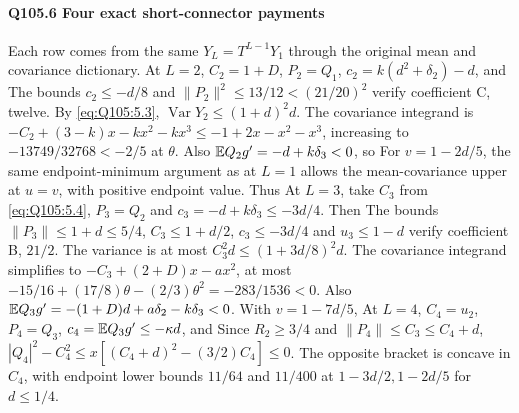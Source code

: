\paragraph{Q105.6 Four exact short-connector payments}\label{part:Q105.6}
Each row comes from the same $Y_L=\allowbreak T^{L-1}Y_1$ through the original
mean and covariance dictionary.
At $L=\allowbreak 2$, $C_2=\allowbreak 1+D$, $P_2=\allowbreak Q_1$, $c_2=\allowbreak k(d^2+\delta_2)-d$, and
The bounds $c_2\le\allowbreak -d/8$ and
$\|P_2\|^2\le\allowbreak 13/12<\allowbreak (21/20)^2$ verify coefficient C, twelve.
By \eqref{eq:Q105:5.3}, $\operatorname{Var}Y_2\le\allowbreak (1+d)^2d$.
The covariance integrand is
$-C_2+(3-k)x-kx^2-kx^3\le\allowbreak -1+2x-x^2-x^3$,
increasing to $-13749/32768<\allowbreak -2/5$ at $\theta$.
Also $\mathbb E Q_2g'=\allowbreak -d+k\delta_3<\allowbreak 0$, so
For $v=\allowbreak 1-2d/5$, the same endpoint-minimum argument as at $L=\allowbreak 1$
allows the mean-covariance upper at $u=\allowbreak v$, with positive endpoint value.
Thus
At $L=\allowbreak 3$, take $C_3$ from \eqref{eq:Q105:5.4}, $P_3=\allowbreak Q_2$ and
$c_3=\allowbreak -d+k\delta_3\le\allowbreak -3d/4$. Then
The bounds $\|P_3\|\le\allowbreak 1+d\le\allowbreak 5/4$, $C_3\le\allowbreak 1+d/2$,
$c_3\le\allowbreak -3d/4$ and $u_3\le\allowbreak 1-d$ verify coefficient B, $21/2$.
The variance is at most $C_3^2d\le\allowbreak (1+3d/8)^2d$.
The covariance integrand simplifies to $-C_3+(2+D)x-ax^2$, at most
$-15/16+(17/8)\theta-(2/3)\theta^2=\allowbreak -283/1536<\allowbreak 0$.
Also $\mathbb E Q_3g'=\allowbreak -(1+D)d+a\delta_2-k\delta_3<\allowbreak 0$.
With $v=\allowbreak 1-7d/5$,
At $L=\allowbreak 4$, $C_4=\allowbreak u_2$, $P_4=\allowbreak Q_3$, $c_4=\allowbreak \mathbb E Q_3g'\le\allowbreak -\kappa d$, and
Since $R_2\ge\allowbreak 3/4$ and $\|P_4\|\le\allowbreak  C_3\le\allowbreak  C_4+d$,
$|Q_4|^2-C_4^2\le\allowbreak  x[(C_4+d)^2-(3/2)C_4]\le\allowbreak 0$.
The opposite bracket is concave in $C_4$, with endpoint lower bounds
$11/64$ and $11/400$ at $1-3d/2,\allowbreak 1-2d/5$ for $d\le\allowbreak 1/4$.
